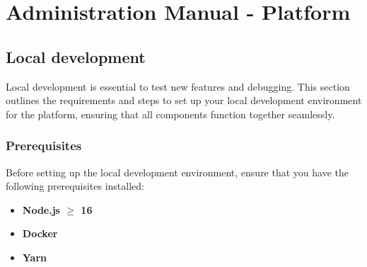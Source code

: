 \chapter{Administration Manual - Platform}
\label{attachments:admin-manual-platform}

\section{Local development}
\label{attachments:admin-manual-local-development}
Local development is essential to test new features and debugging. This section outlines the requirements and steps to set up your local development environment for the platform, ensuring that all components function together seamlessly.


\subsection{Prerequisites}
Before setting up the local development environment, ensure that you have the following prerequisites installed:
\begin{itemize}
    \item \textbf{Node.js $\geq$ 16}
    \item \textbf{Docker}
    \item \textbf{Yarn}
\end{itemize}

